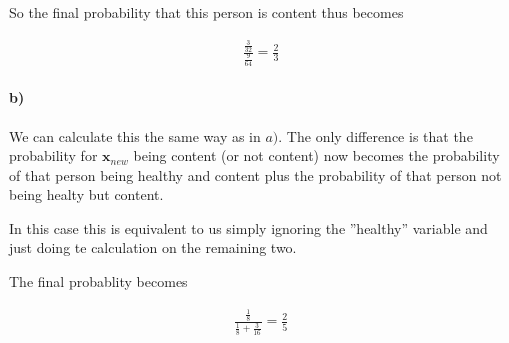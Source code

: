 \documentclass{article}
\begin{document}
So the final probability that this person is content thus becomes

\begin{align}
  \frac{\frac{3}{32}}{\frac{9}{64}} = \frac{2}{3}
\end{align}

\paragraph{b)}

We can calculate this the same way as in $a)$. The only difference is that the
probability for $\mathbf{x}_{new}$ being content (or not content) now becomes
the probability of that person being healthy and content plus the probability
of that person not being healty but content.

In this case this is equivalent to us simply ignoring the ''healthy'' variable
and just doing te calculation on the remaining two.

The final probablity becomes

\begin{align}
  \frac{\frac{1}{8}}{\frac{1}{8} + \frac{3}{16}} = \frac{2}{5}
\end{align}

\subsection{}

\setcounter{section}{2}
\setcounter{subsection}{0}
\subsection{}

\subsection{}
\end{document}
